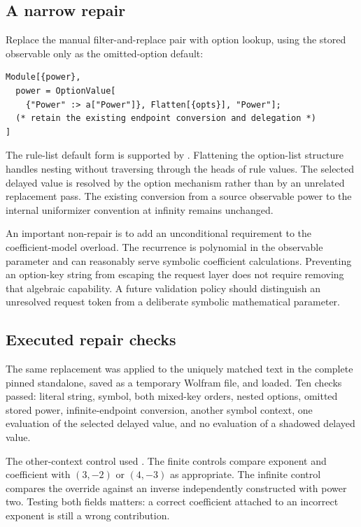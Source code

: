 \documentclass[11pt,letterpaper]{article}
\newcommand{\code}[1]{\texttt{\detokenize{#1}}}
\begin{document}
\subsection{A narrow repair}
Replace the manual filter-and-replace pair with option lookup, using the stored observable only as the omitted-option default:
\begin{lstlisting}
Module[{power},
  power = OptionValue[
    {"Power" :> a["Power"]}, Flatten[{opts}], "Power"];
  (* retain the existing endpoint conversion and delegation *)
]
\end{lstlisting}
The rule-list default form is supported by \code{OptionValue}. Flattening the option-list structure handles nesting without traversing through the heads of rule values. The selected delayed value is resolved by the option mechanism rather than by an unrelated replacement pass. The existing conversion from a source observable power to the internal uniformizer convention at infinity remains unchanged.~\cite{optionvalue,optionspattern,core}

An important non-repair is to add an unconditional \code{NumericQ} requirement to the coefficient-model overload. The recurrence is polynomial in the observable parameter and can reasonably serve symbolic coefficient calculations. Preventing an option-key string from escaping the request layer does not require removing that algebraic capability. A future validation policy should distinguish an unresolved request token from a deliberate symbolic mathematical parameter.

\subsection{Executed repair checks}
The same replacement was applied to the uniquely matched text in the complete pinned standalone, saved as a temporary Wolfram file, and loaded. Ten checks passed: literal string, symbol, both mixed-key orders, nested options, omitted stored power, infinite-endpoint conversion, another symbol context, one evaluation of the selected delayed value, and no evaluation of a shadowed delayed value.

The other-context control used \code{AuditOptions`Power -> 2}. The finite controls compare exponent and coefficient with $(3,-2)$ or $(4,-3)$ as appropriate. The infinite control compares the override against an inverse independently constructed with power two. Testing both fields matters: a correct coefficient attached to an incorrect exponent is still a wrong contribution.
\end{document}

